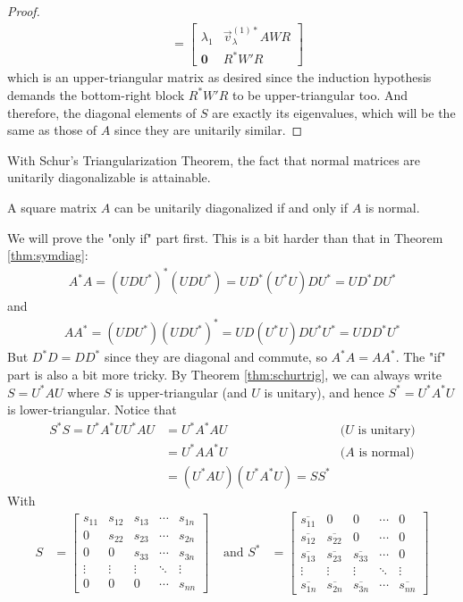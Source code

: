 \begin{proof}
\begin{align*}
&=
\left[\begin{array}{cc}
\lambda_1 & \vec{v}_\lambda^{(1)*}AWR \\
\textbf{0} & R^*W'R
\end{array}\right]
\end{align*}
which is an upper-triangular matrix as desired since the induction hypothesis demands the bottom-right block $R^*W'R$ to be upper-triangular too. And therefore, the diagonal elements of $S$ are exactly its eigenvalues, which will be the same as those of $A$ since they are unitarily similar. 
\end{proof}

With Schur's Triangularization Theorem, the fact that normal matrices are unitarily diagonalizable is attainable.
\begin{thm}
\label{thm:normalunidiag}
A square matrix $A$ can be unitarily diagonalized if and only if $A$ is normal.
\end{thm}
We will prove the "only if" part first. This is a bit harder than that in Theorem \ref{thm:symdiag}:
\begin{align*}
A^*A = (UDU^*)^*(UDU^*) = UD^*(U^*U) DU^* = UD^*DU^* 
\end{align*}
and
\begin{align*}
AA^* = (UDU^*)(UDU^*)^* = UD(U^*U) DU^*U^* = UDD^*U^*  
\end{align*}
But $D^*D = DD^*$ since they are diagonal and commute, so $A^*A = AA^*$. The "if" part is also a bit more tricky. By Theorem \ref{thm:schurtrig}, we can always write $S = U^*AU$ where $S$ is upper-triangular (and $U$ is unitary), and hence $S^* = U^*A^*U$ is lower-triangular. Notice that
\begin{align*}
S^*S = U^*A^*U U^*AU &= U^*A^* AU &\text{($U$ is unitary)} \\
&= U^*AA^*U &\text{($A$ is normal)} \\
&= (U^*AU) (U^*A^*U) = SS^*
\end{align*}
With
\begin{align*}
S &= 
\begin{bmatrix}
s_{11} & s_{12} & s_{13} & \cdots & s_{1n} \\
0 & s_{22} & s_{23} & \cdots & s_{2n} \\
0 & 0 & s_{33} & \cdots & s_{3n} \\
\vdots & \vdots & \vdots & \ddots & \vdots \\
0 & 0 & 0 & \cdots & s_{nn}
\end{bmatrix}
& \text{ and } 
S^* &= 
\begin{bmatrix}
\overline{s_{11}} & 0 & 0 & \cdots & 0 \\
\overline{s_{12}} & \overline{s_{22}} & 0 & \cdots & 0 \\
\overline{s_{13}} & \overline{s_{23}} & \overline{s_{33}} & \cdots & 0 \\
\vdots & \vdots & \vdots & \ddots & \vdots \\
\overline{s_{1n}} & \overline{s_{2n}} & \overline{s_{3n}} & \cdots & \overline{s_{nn}}
\end{bmatrix}
\end{align*}
